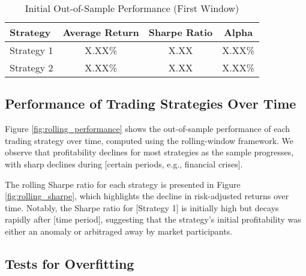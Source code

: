 \begin{table}[H]
    \centering
    \caption{Initial Out-of-Sample Performance (First Window)}
    \label{tab:initial_performance}
    \begin{tabular}{lccc}
        \hline
        \textbf{Strategy} & \textbf{Average Return} & \textbf{Sharpe Ratio} & \textbf{Alpha} \\
        \hline
        Strategy 1 & X.XX\% & X.XX & X.XX\% \\
        Strategy 2 & X.XX\% & X.XX & X.XX\% \\
        \hline
    \end{tabular}
\end{table}

\subsection{Performance of Trading Strategies Over Time}

Figure \ref{fig:rolling_performance} shows the out-of-sample performance of each trading strategy over time, computed using the rolling-window framework. We observe that profitability declines for most strategies as the sample progresses, with sharp declines during [certain periods, e.g., financial crises].


The rolling Sharpe ratio for each strategy is presented in Figure \ref{fig:rolling_sharpe}, which highlights the decline in risk-adjusted returns over time. Notably, the Sharpe ratio for [Strategy 1] is initially high but decays rapidly after [time period], suggesting that the strategy's initial profitability was either an anomaly or arbitraged away by market participants.


\subsection{Tests for Overfitting}

